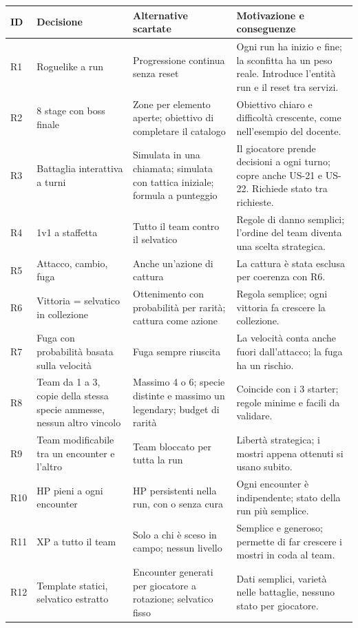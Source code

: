\documentclass[11pt,a4paper]{article}
\begin{document}
\begin{xltabular}{\linewidth}{@{}L{0.8cm}L{3.3cm}L{4.4cm}Y@{}}
  \toprule
  ID & Decisione & Alternative scartate & Motivazione e conseguenze \\
  \midrule
  \endhead
  R1 & Roguelike a run & Progressione continua senza reset & Ogni run ha inizio e fine; la sconfitta ha un peso reale. Introduce l'entità run e il reset tra servizi. \\
  R2 & 8 stage con boss finale & Zone per elemento aperte; obiettivo di completare il catalogo & Obiettivo chiaro e difficoltà crescente, come nell'esempio del docente. \\
  R3 & Battaglia interattiva a turni & Simulata in una chiamata; simulata con tattica iniziale; formula a punteggio & Il giocatore prende decisioni a ogni turno; copre anche US-21 e US-22. Richiede stato tra richieste. \\
  R4 & 1v1 a staffetta & Tutto il team contro il selvatico & Regole di danno semplici; l'ordine del team diventa una scelta strategica. \\
  R5 & Attacco, cambio, fuga & Anche un'azione di cattura & La cattura è stata esclusa per coerenza con R6. \\
  R6 & Vittoria = selvatico in collezione & Ottenimento con probabilità per rarità; cattura come azione & Regola semplice; ogni vittoria fa crescere la collezione. \\
  R7 & Fuga con probabilità basata sulla velocità & Fuga sempre riuscita & La velocità conta anche fuori dall'attacco; la fuga ha un rischio. \\
  R8 & Team da 1 a 3, copie della stessa specie ammesse, nessun altro vincolo & Massimo 4 o 6; specie distinte e massimo un legendary; budget di rarità & Coincide con i 3 starter; regole minime e facili da validare. \\
  R9 & Team modificabile tra un encounter e l'altro & Team bloccato per tutta la run & Libertà strategica; i mostri appena ottenuti si usano subito. \\
  R10 & HP pieni a ogni encounter & HP persistenti nella run, con o senza cura & Ogni encounter è indipendente; stato della run più semplice. \\
  R11 & XP a tutto il team & Solo a chi è sceso in campo; nessun livello & Semplice e generoso; permette di far crescere i mostri in coda al team. \\
  R12 & Template statici, selvatico estratto & Encounter generati per giocatore a rotazione; selvatico fisso & Dati semplici, varietà nelle battaglie, nessuno stato per giocatore. \\

\end{xltabular}
\end{document}
